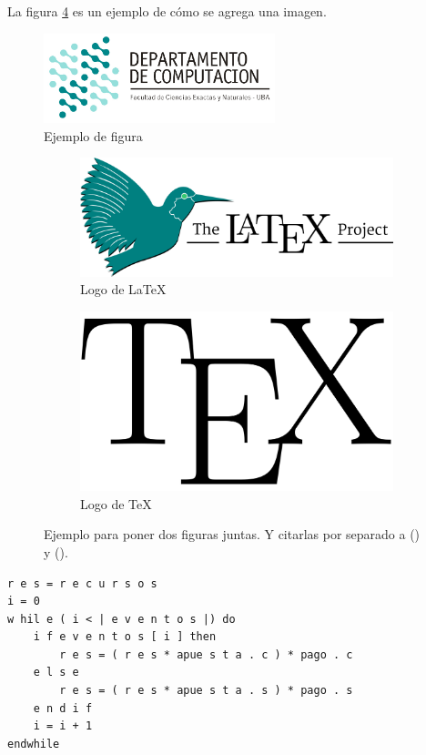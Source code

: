 \documentclass[10pt,a4paper]{article}
\begin{document}
La figura \ref{fig:subfigs} es un ejemplo de cómo se agrega una imagen.

\begin{figure}[ht]
	\centering
	\includegraphics[width=0.6\textwidth]{logo_dc.jpg}
	\caption{Ejemplo de figura}
	\label{fig:ejemplo}
\end{figure}

\begin{figure}[ht!]
	\begin{subfigure}{0.5\textwidth}
		\includegraphics[width=0.9\linewidth]{LaTeX-project} 
		\caption{Logo de LaTeX}
		\label{fig:subfig1}
	\end{subfigure}
	\begin{subfigure}{0.5\textwidth}
		\includegraphics[width=0.7\linewidth]{TeX}
		\caption{Logo de TeX}
		\label{fig:subfig2}
	\end{subfigure}
	\caption{Ejemplo para poner dos figuras juntas. Y citarlas por separado a () y ().}
	\label{fig:subfigs}
\end{figure}



	\begin{lstlisting}[caption={Ejemplo de código (usando los estilos de la cátedra, ver las macros para más detalles)},label=code:for]
r e s = r e c u r s o s
i = 0
w hil e ( i < | e v e n t o s |) do
	i f e v e n t o s [ i ] then
		r e s = ( r e s * apue s t a . c ) * pago . c
	e l s e
		r e s = ( r e s * apue s t a . s ) * pago . s
	e n d i f
	i = i + 1
endwhile
	\end{lstlisting}
\end{document}
